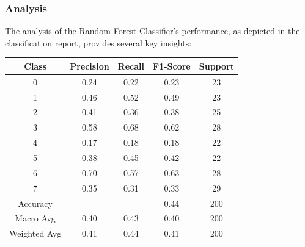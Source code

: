 \documentclass[12pt]{article}
\begin{document}
\subsubsection{Analysis}
The analysis of the Random Forest Classifier's performance, as depicted in the classification report, provides several key insights:
\begin{center}
    \begin{tabular}{|c|c|c|c|c|}
    \hline
    Class & Precision & Recall & F1-Score & Support \\
    \hline
    0 & 0.24 & 0.22 & 0.23 & 23 \\
    1 & 0.46 & 0.52 & 0.49 & 23 \\
    2 & 0.41 & 0.36 & 0.38 & 25 \\
    3 & 0.58 & 0.68 & 0.62 & 28 \\
    4 & 0.17 & 0.18 & 0.18 & 22 \\
    5 & 0.38 & 0.45 & 0.42 & 22 \\
    6 & 0.70 & 0.57 & 0.63 & 28 \\
    7 & 0.35 & 0.31 & 0.33 & 29 \\
    \hline
    Accuracy & & & 0.44 & 200 \\
    \hline
    Macro Avg & 0.40 & 0.43 & 0.40 & 200 \\
    Weighted Avg & 0.41 & 0.44 & 0.41 & 200 \\
    \hline
    \end{tabular}
    \end{center}
    
\end{document}
